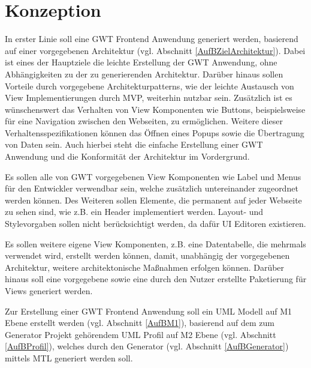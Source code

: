 \chapter{Konzeption}
\label{Konzeption}
In erster Linie soll eine GWT Frontend Anwendung generiert werden, basierend auf
einer vorgegebenen Architektur (vgl. Abschnitt \ref{AufBZielArchitektur}). Dabei
ist eines der Hauptziele die leichte Erstellung der GWT Anwendung, ohne
Abhängigkeiten zu der zu generierenden Architektur. Darüber hinaus sollen
Vorteile durch vorgegebene Architekturpatterns, wie der leichte Austausch von
View Implementierungen durch MVP, weiterhin nutzbar sein. Zusätzlich ist es
wünschenswert das Verhalten von View Komponenten wie Buttons, beispielsweise für
eine Navigation zwischen den Webseiten, zu ermöglichen. Weitere dieser
Verhaltensspezifikationen können das Öffnen eines Popups sowie die Übertragung von Daten sein. Auch hierbei
steht die einfache Erstellung einer GWT Anwendung und die Konformität
der Architektur im Vordergrund.

Es sollen alle von GWT vorgegebenen View Komponenten wie Label und
Menus für den Entwickler verwendbar sein, welche zusätzlich
untereinander zugeordnet werden können. Des Weiteren sollen Elemente, die
permanent auf jeder Webseite zu sehen sind, wie z.B. ein Header implementiert
werden.
Layout- und Stylevorgaben sollen nicht berücksichtigt werden, da dafür UI Editoren
existieren.

Es sollen weitere eigene View Komponenten, z.B. eine Datentabelle, die mehrmals
verwendet wird, erstellt werden können, damit, unabhängig der vorgegebenen
Architektur, weitere architektonische Maßnahmen erfolgen können. Darüber hinaus soll
eine vorgegebene sowie eine durch den Nutzer erstellte Paketierung
für Views generiert werden.

Zur Erstellung einer GWT Frontend Anwendung soll ein UML Modell auf M1 Ebene
erstellt werden (vgl. Abschnitt \ref{AufBM1}), basierend auf dem zum
Generator Projekt gehörendem UML Profil auf M2 Ebene (vgl. Abschnitt
\ref{AufBProfil}), welches durch den Generator (vgl. Abschnitt \ref{AufBGenerator}) mittels
MTL generiert werden soll.


